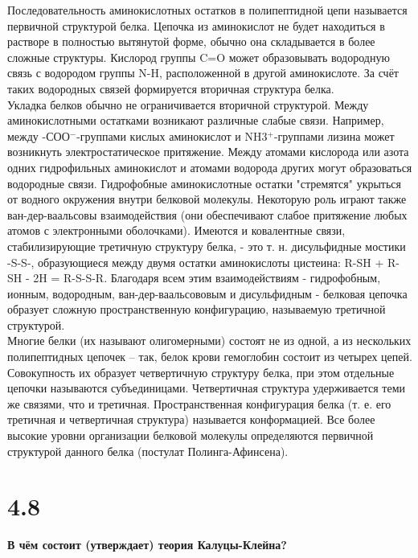 \documentclass[a4paper,14pt]{article}
\begin{document}
Последовательность аминокислотных остатков в полипептидной цепи называется первичной структурой белка.
Цепочка из аминокислот не будет находиться в растворе в полностью вытянутой форме, обычно она складывается в более сложные структуры. Кислород группы C=O может образовывать водородную связь с водородом группы N-H, расположенной в другой аминокислоте. За счёт таких водородных связей формируется вторичная структура белка.\\
Укладка белков обычно не ограничивается вторичной структурой. Между аминокислотными остатками возникают различные слабые связи. Например, между -СОО$^-$-группами кислых аминокислот и NH3$^+$-группами лизина может возникнуть электростатическое притяжение. Между атомами кислорода или азота одних гидрофильных аминокислот и атомами водорода других могут образоваться водородные связи. Гидрофобные аминокислотные остатки "стремятся" укрыться от водного окружения внутри белковой молекулы. Некоторую роль играют также ван-дер-ваальсовы взаимодействия (они обеспечивают слабое притяжение любых атомов с электронными оболочками). Имеются и ковалентные связи, стабилизирующие третичную структуру белка, - это т. н. дисульфидные мостики -S-S-, образующиеся между двумя остатки аминокислоты цистеина: R-SH + R-SH - 2H = R-S-S-R. Благодаря всем этим взаимодействиям - гидрофобным, ионным, водородным, ван-дер-ваальсововым и дисульфидным - белковая цепочка образует сложную пространственную конфигурацию, называемую третичной структурой.\\
Многие белки (их называют олигомерными) состоят не из одной, а из нескольких полипептидных цепочек – так, белок крови гемоглобин состоит из четырех цепей. Совокупность их образует четвертичную структуру белка, при этом отдельные цепочки называются субъединицами. Четвертичная структура удерживается теми же связями, что и третичная. Пространственная конфигурация белка (т. е. его третичная и четвертичная структура) называется конформацией. Все более высокие уровни организации белковой молекулы определяются первичной структурой данного белка (постулат Полинга-Афинсена).

\section*{4.8}

\begin{center}
	\LARGE{\textbf{В чём состоит (утверждает) теория Калуцы-Клейна?}}\\
\end{center}
\end{document}
